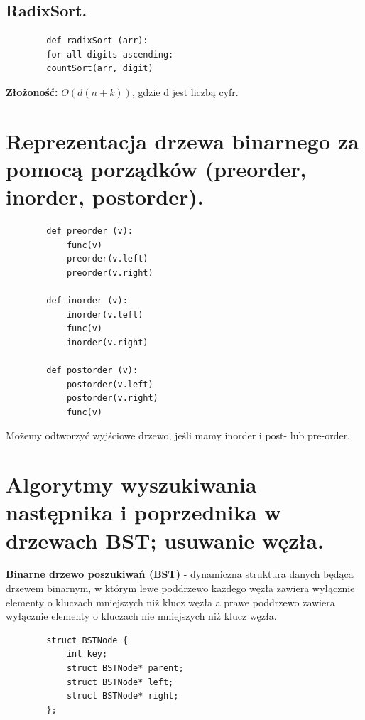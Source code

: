 \documentclass[12pt]{article}
\begin{document}
    \subsection{RadixSort.}
    \begin{verbatim}
        def radixSort (arr):
        for all digits ascending:
        countSort(arr, digit)
    \end{verbatim}
    \textbf{Złożoność:} $O(d(n+k))$, gdzie d jest liczbą cyfr.

    \newpage

    \section{Reprezentacja drzewa binarnego za pomocą porządków (preorder, inorder, postorder).}


    \begin{verbatim}
        def preorder (v):
            func(v)
            preorder(v.left)
            preorder(v.right)

        def inorder (v):
            inorder(v.left)
            func(v)
            inorder(v.right)

        def postorder (v):
            postorder(v.left)
            postorder(v.right)
            func(v)
    \end{verbatim}

    Możemy odtworzyć wyjściowe drzewo, jeśli mamy inorder i post- lub pre-order.

    \newpage

    \section{Algorytmy wyszukiwania następnika i poprzednika w drzewach BST; usuwanie węzła.}

    \begin{definition}
        \textbf{Binarne drzewo poszukiwań (BST)} - dynamiczna struktura danych będąca drzewem binarnym, w którym lewe
        poddrzewo każdego węzła zawiera wyłącznie elementy o kluczach mniejszych niż klucz węzła a prawe poddrzewo
        zawiera wyłącznie elementy o kluczach nie mniejszych niż klucz węzła.
    \end{definition}

    \begin{verbatim}
        struct BSTNode {
            int key;
            struct BSTNode* parent;
            struct BSTNode* left;
            struct BSTNode* right;
        };
    \end{verbatim}
\end{document}
